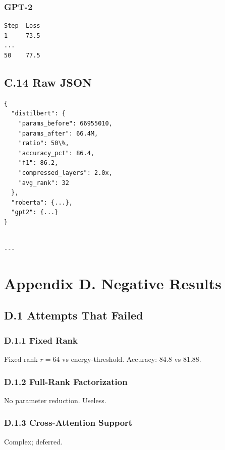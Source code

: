 \subsubsection{GPT-2}
\begin{lstlisting}
Step  Loss
1     73.5
...
50    77.5
\end{lstlisting}

\subsection{C.14 Raw JSON}

\begin{lstlisting}
{
  "distilbert": {
    "params_before": 66955010,
    "params_after": 66.4M,
    "ratio": 50\%,
    "accuracy_pct": 86.4,
    "f1": 86.2,
    "compressed_layers": 2.0x,
    "avg_rank": 32
  },
  "roberta": {...},
  "gpt2": {...}
}
\end{lstlisting}
\begin{lstlisting}

---
\end{lstlisting}


\section{Appendix D. Negative Results}

\subsection{D.1 Attempts That Failed}

\subsubsection{D.1.1 Fixed Rank}

Fixed rank $r = 64$ vs energy-threshold. Accuracy: 84.8 vs 81.88.

\subsubsection{D.1.2 Full-Rank Factorization}

No parameter reduction. Useless.

\subsubsection{D.1.3 Cross-Attention Support}

Complex; deferred.

